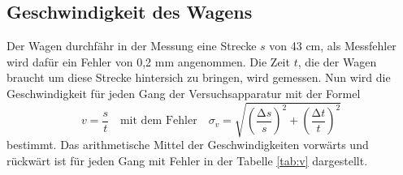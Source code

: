 \subsection{Geschwindigkeit des Wagens}
Der Wagen durchfähr in der Messung eine Strecke $s$ von 43 cm, als Messfehler
wird dafür ein Fehler von 0,2 mm angenommen. Die Zeit $t$, die der Wagen braucht
um diese Strecke hintersich zu bringen, wird gemessen. Nun wird die
Geschwindigkeit für jeden Gang der Versuchsapparatur  mit der Formel
\begin{equation*}
  v = \frac{s}{t} \quad \text{mit dem Fehler} \quad
  \sigma_v = \sqrt{\left(\frac{\increment s}{s}\right)^2 + \left(\frac{\increment t}{t}\right)^2}
\end{equation*}
bestimmt. Das arithmetische Mittel der Geschwindigkeiten vorwärts und rückwärt
ist für
jeden Gang mit Fehler in der Tabelle \ref{tab:v} dargestellt.
